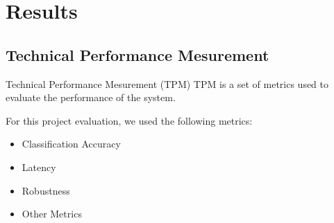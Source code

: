 \section{Results}

\subsection*{Technical Performance Mesurement}
\begin{frame}{Technical Performance Mesurement (TPM)}
    TPM is a set of metrics used to evaluate the performance of the system.

    \vspace*{.5cm}
    For this project evaluation, we used the following metrics:
    \begin{itemize}
        \item Classification Accuracy
        \item Latency
        \item Robustness
        \item Other Metrics
    \end{itemize}
\end{frame}

